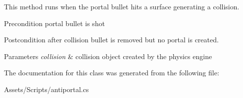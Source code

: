 This method runs when the portal bullet hits a surface generating a collision. \begin{DoxyPrecond}{Precondition}
portal bullet is shot 
\end{DoxyPrecond}
\begin{DoxyPostcond}{Postcondition}
after collision bullet is removed but no portal is created. 
\end{DoxyPostcond}

\begin{DoxyParams}{Parameters}
{\em collision} & collision object created by the physics engine \\
\hline
\end{DoxyParams}


The documentation for this class was generated from the following file\+:\begin{DoxyCompactItemize}
\item 
Assets/\+Scripts/antiportal.\+cs\end{DoxyCompactItemize}
